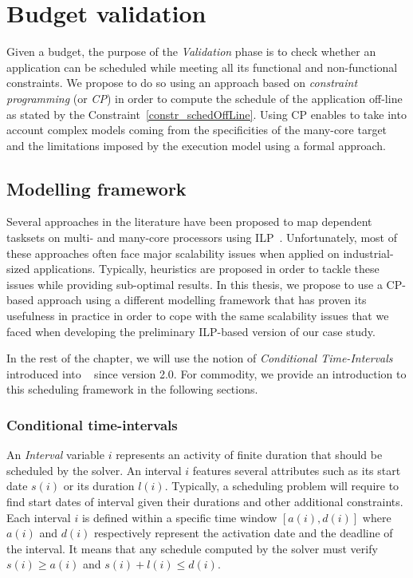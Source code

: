 \documentclass[main.tex]{subfiles}
\begin{document}
\section{Budget validation}
Given a budget, the purpose of the \emph{Validation} phase is to check whether
an application can be scheduled while meeting all its functional and
non-functional constraints. We propose to do so using an approach based on
\emph{constraint programming} (or \emph{CP}) in order to compute the schedule
of the application off-line as stated by the
Constraint~\ref{constr_schedOffLine}. Using CP enables to take into account
complex models coming from the specificities of the many-core target and the
limitations imposed by the execution model using a formal approach. 

\subsection{Modelling framework}
Several approaches in the literature have been proposed to map dependent
tasksets on multi- and many-core processors using
ILP~\cite{Becker16,gorcitz2015,PuffitschNP15}. Unfortunately, most of these
approaches often face major scalability issues when applied on industrial-sized
applications. Typically, heuristics are proposed in order to tackle these
issues while providing sub-optimal results. In this thesis, we propose to use a
CP-based approach using a different modelling framework that has proven its
usefulness in practice in order to cope with the same scalability issues that
we faced when developing the preliminary ILP-based version of our case study. 

In the rest of the chapter, we will use the notion of \emph{Conditional
Time-Intervals}~\cite{Laborie08, Laborie09} introduced into \CPOpti~\cite{OPL}
since version 2.0. For commodity, we provide an introduction to this scheduling
framework in the following sections.

\subsubsection{Conditional time-intervals}
An \emph{Interval} variable $i$ represents an activity of finite duration that
should be scheduled by the solver. An interval $i$ features several attributes
such as its start date $s(i)$ or its duration $l(i)$. Typically, a scheduling
problem will require to find start dates of interval given their durations and
other additional constraints. Each interval $i$ is defined within a specific
time window $[a(i) , d(i)]$ where $a(i)$ and $d(i)$ respectively represent the
activation date and the deadline of the interval. It means that any schedule
computed by the solver must verify $s(i) \geq a(i)$ and $s(i)+l(i) \leq d(i)$.
\end{document}
